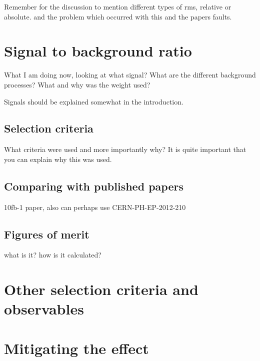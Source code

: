 Remember for the discussion to mention different types of rms, relative or absolute. and the problem which occurred with this and the papers faults.

\section{Signal to background ratio}
What I am doing now, looking at what signal? What are the different background processes? What and why was the weight used?

Signals should be explained somewhat in the introduction.
 
\subsection{Selection criteria}
What criteria were used and more importantly why? It is quite important that you can explain why this was used.

\subsection{Comparing with published papers} 	
10fb-1 paper, also can perhaps use CERN-PH-EP-2012-210
\subsection{Figures of merit}
what is it? how is it calculated?
\section{Other selection criteria and observables}
\section{Mitigating the effect}